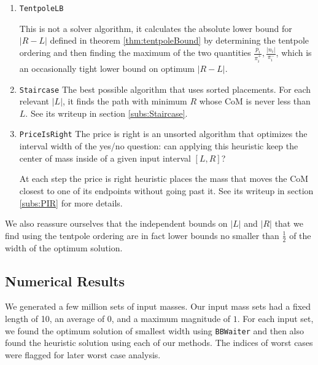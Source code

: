 \documentclass[11pt,twocolumn]{article}
\begin{document}
\begin{enumerate}
\item \texttt{TentpoleLB}

This is not a solver algorithm, it calculates the absolute lower bound for $|R-L|$ defined in theorem \ref{thm:tentpoleBound} by determining the tentpole ordering and then finding the maximum of the two quantities $\frac{p_i}{\pi^+_i},\frac{|n_i|}{\pi^-_i}$, which is an occasionally tight lower bound on optimum $|R-L|$.

\item \texttt{Staircase} The best possible algorithm that uses sorted placements. For each relevant $|L|$, it finds the path with minimum $R$ whose CoM is never less than $L$.   See its writeup in section \ref{subs:Staircase}.

\item \texttt{PriceIsRight}
The price is right is an unsorted algorithm that optimizes the interval width of the yes/no question: can applying this heuristic keep the center of mass inside of a given input interval $[L,R]$?

At each step the price is right heuristic places the mass that moves the CoM closest to one of its endpoints without going past it.  See its writeup in section \ref{subs:PIR} for more details.

\end{enumerate}

We also reassure ourselves that the independent bounds on $|L|$ and $|R|$ that we find using the tentpole ordering are in fact lower bounds no smaller than $\frac12$ of the width of the optimum solution.

\subsection{Numerical Results}

We generated a few million sets of input masses.  Our input mass sets had a fixed length of 10, an average of 0, and a maximum magnitude of $1$.  For each input set, we found the optimum solution of smallest width using \texttt{BBWaiter} and then also found the heuristic solution using each of our methods.  The indices of worst cases were flagged for later worst case analysis. 
\end{document}
